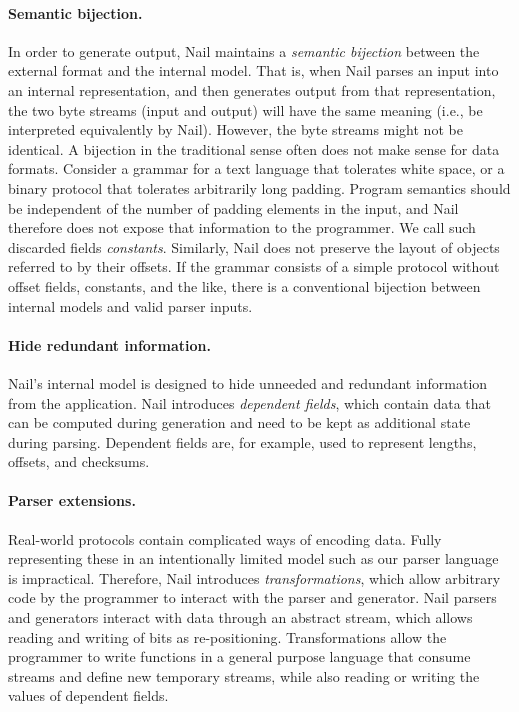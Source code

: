\noindent

\paragraph{Semantic bijection.}

In order to generate output, Nail maintains
a \emph{semantic bijection} between the external format and the internal model.
That is, when Nail parses an input into an internal representation, and then
generates output from that representation, the two byte streams (input and
output) will have the same meaning (i.e., be interpreted equivalently by Nail).
However, the byte streams might not be identical.
A bijection in the traditional sense often does not make sense for data
formats. Consider a grammar for a text language that tolerates white space, or a binary protocol
that tolerates arbitrarily long padding.
 Program semantics should be independent of the number of padding elements in the input, and Nail therefore
does not expose that information to the programmer. We call such discarded fields \emph{constants}.
Similarly, Nail does not preserve the layout of objects referred to by their offsets. If the grammar
consists of a simple protocol without offset fields, constants, and the like, there is a conventional
bijection between  internal models and valid parser inputs.

\paragraph{Hide redundant information.}
Nail's internal model is designed to hide unneeded and redundant information from the application.
Nail introduces \emph{dependent fields}, which contain data that can be computed during generation
and need to be kept as additional state during parsing. Dependent fields are, for example, used to represent
lengths, offsets, and checksums.

\paragraph{Parser extensions.}
Real-world protocols contain complicated ways of encoding data. Fully representing these in an
intentionally limited model such as our parser language is impractical. Therefore, Nail introduces
\emph{transformations}, which allow arbitrary code by the programmer to interact with the parser and
generator. Nail parsers and generators interact with data through an abstract stream, which allows
reading and writing of bits as re-positioning. Transformations allow the programmer to write
functions in a general purpose language that consume streams and define new temporary streams, while
also reading or writing the values of dependent fields.

